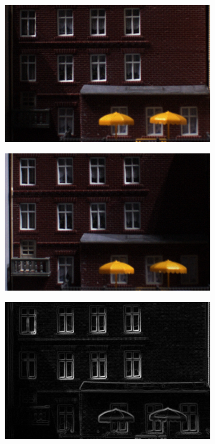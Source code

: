 \documentclass[thesis.tex]{subfiles}
\begin{document}
\begin{figure}[tb]
    \centering
    \begin{subfigure}[t]{0.49\textwidth}
        \includegraphics[width=\textwidth]{img/pixelNormalizationExample1.png}
        \caption{}
        \label{fig:pixelNormalizationExample1}
    \end{subfigure}
    \begin{subfigure}[t]{0.49\textwidth}
        \includegraphics[width=\textwidth]{img/pixelNormalizationExample2.png}
        \caption{}
        \label{fig:pixelNormalizationExample2}
    \end{subfigure}
    \begin{subfigure}[t]{0.49\textwidth}
        \includegraphics[width=\textwidth]{img/pixelNormalizationExample3.png}

\end{subfigure}
\end{figure}
\end{document}
